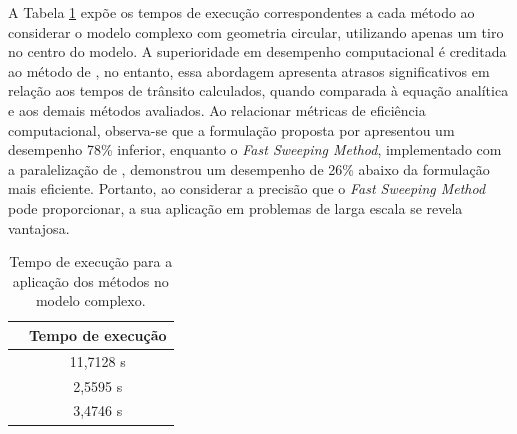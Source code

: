 A Tabela \ref{table_overthrust} expõe os tempos de execução correspondentes a cada método ao considerar o modelo complexo com geometria circular, utilizando apenas um tiro no centro do modelo. A superioridade em desempenho computacional é creditada ao método de , no entanto, essa abordagem apresenta atrasos significativos em relação aos tempos de trânsito calculados, quando comparada à equação analítica e aos demais métodos avaliados. Ao relacionar métricas de eficiência computacional, observa-se que a formulação proposta por  apresentou um desempenho 78\% inferior, enquanto o \textit{Fast Sweeping Method}, implementado com a paralelização de , demonstrou um desempenho de 26\% abaixo da formulação mais eficiente. Portanto, ao considerar a precisão que o \textit{Fast Sweeping Method} pode proporcionar, a sua aplicação em problemas de larga escala se revela vantajosa.

\begin{table}[H]
	\caption{Tempo de execução para a aplicação dos métodos no modelo complexo.}
	\begin{tabular}{r|c}
		& Tempo de execução \\ \hline
		\citeonline{podvin1991finite} & 11,7128 s  \\ \hline
		\citeonline{jeong2008fast} & 2,5595 s      \\ \hline
		\citeonline{noble2014accurate} & 3,4746 s         
	\end{tabular}
	\label{table_overthrust}
\end{table}

